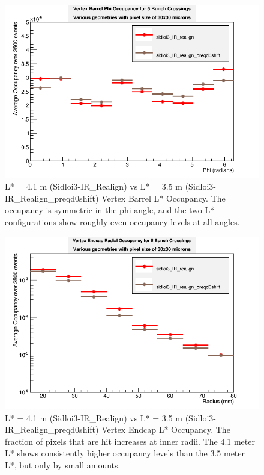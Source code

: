 \documentclass{report}
\begin{document}
                \begin{figure}[H] 
                    \includegraphics[height=.4\textheight]{VradOccupancy_Lstar_brl}
                    \centering
                    \caption{L* = 4.1 m (Sidloi3-IR\_Realign) vs L* = 3.5 m (Sidloi3-IR\_Realign\_preqd0shift) Vertex Barrel L* Occupancy. The occupancy is symmetric in the phi angle, and the two L* configurations show roughly even occupancy levels at all angles.}
                    \label{fig__lstar_vertex_brl}
                \end{figure}
                \begin{figure}[H] 
                    \includegraphics[height=.4\textheight]{VradOccupancy_Lstar_ecp}
                    \centering
                    \caption{L* = 4.1 m (Sidloi3-IR\_Realign) vs L* = 3.5 m (Sidloi3-IR\_Realign\_preqd0shift) Vertex Endcap L* Occupancy. The fraction of pixels that are hit increases at inner radii.  The 4.1 meter L* shows consistently higher occupancy levels than the 3.5 meter L*, but only by small amounts. }
                    \label{fig__lstar_vertex_ecp}
                \end{figure}
\end{document}

